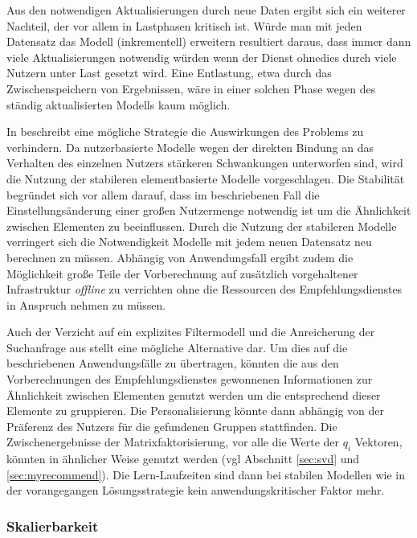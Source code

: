 Aus den notwendigen Aktualisierungen durch neue Daten ergibt sich ein weiterer Nachteil, der vor allem in Lastphasen kritisch ist. Würde man mit jeden Datensatz das Modell (inkrementell) erweitern resultiert daraus, dass immer dann viele Aktualisierungen notwendig würden wenn der Dienst ohnedies durch viele Nutzern unter Last gesetzt wird. Eine Entlastung, etwa durch das Zwischenspeichern von Ergebnissen, wäre in einer solchen Phase wegen des ständig aktualisierten Modells kaum möglich.

In \citep{linden03} beschreibt eine mögliche Strategie die Auswirkungen des Problems zu verhindern. Da nutzerbasierte Modelle wegen der direkten Bindung an das Verhalten des einzelnen Nutzers stärkeren Schwankungen unterworfen sind, wird die Nutzung der stabileren elementbasierte Modelle vorgeschlagen. Die Stabilität begründet sich vor allem darauf, dass im beschriebenen Fall die Einstellungsänderung einer großen Nutzermenge notwendig ist um die Ähnlichkeit zwischen Elementen zu beeinflussen. Durch die Nutzung der stabileren Modelle verringert sich die Notwendigkeit Modelle mit jedem neuen Datensatz neu berechnen zu müssen. Abhängig von Anwendungsfall ergibt zudem die Möglichkeit große Teile der Vorberechnung auf zusätzlich vorgehaltener Infrastruktur \textit{offline} zu verrichten ohne die Ressourcen des Empfehlungsdienstes in Anspruch nehmen zu müssen.

Auch der Verzicht auf ein explizites Filtermodell und die Anreicherung der Suchanfrage aus \citep{Boughareb11} stellt eine mögliche Alternative dar. Um dies auf die beschriebenen Anwendungsfälle zu übertragen, könnten die aus den Vorberechnungen des Empfehlungsdienstes gewonnenen Informationen zur Ähnlichkeit zwischen Elementen genutzt werden um die entsprechend dieser Elemente zu gruppieren. Die Personalisierung könnte dann abhängig von der Präferenz des Nutzers für die gefundenen Gruppen stattfinden. Die Zwischenergebnisse der Matrixfaktorisierung, vor alle die Werte der $q_i$ Vektoren, könnten in ähnlicher Weise genutzt werden (vgl Abschnitt \ref{sec:svd} und \ref{sec:myrecommend}). Die Lern-Laufzeiten sind dann bei stabilen Modellen wie in der vorangegangen Lösungsstrategie kein anwendungskritischer Faktor mehr.


\subsubsection{Skalierbarkeit}


